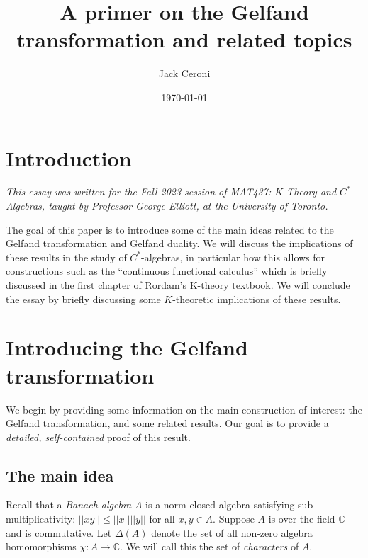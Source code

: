 \documentclass[aps,pra,showpacs,notitlepage,onecolumn,superscriptaddress,nofootinbib]{revtex4-1}
\theoremstyle{definition}
\begin{document}
\title{A primer on the Gelfand transformation and related topics}
\author{Jack Ceroni}

\date{\today}

\maketitle

\section{Introduction}

\noindent \emph{This essay was written for the Fall 2023 session of MAT437: $K$-Theory and $C^{*}$-Algebras, taught by Professor George Elliott, at the University of Toronto.}
\newline

\noindent The goal of this paper is to introduce some of the main ideas related to the Gelfand transformation and Gelfand duality.
We will discuss the implications of these results in the study of $C^{*}$-algebras, in particular how this allows for constructions
such as the ``continuous functional calculus'' which is briefly discussed in the first chapter of Rordam's K-theory textbook. We will conclude the essay by briefly
discussing some $K$-theoretic implications of these results.

\section{Introducing the Gelfand transformation}

\noindent We begin by providing some information on the main construction of interest: the Gelfand transformation, and some related results. Our goal is to provide a \emph{detailed, self-contained} proof
of this result.

\subsection{The main idea}

\noindent Recall that a \emph{Banach algebra} $A$ is a norm-closed algebra satisfying sub-multiplicativity: $||xy|| \leq ||x|| ||y||$ for all $x, y \in A$. Suppose $A$ is over the field $\mathbb{C}$
and is commutative. Let $\Delta(A)$ denote the set of all non-zero algebra homomorphisms $\chi : A \rightarrow \mathbb{C}$. We will call this the set of \emph{characters} of $A$.
\end{document}
